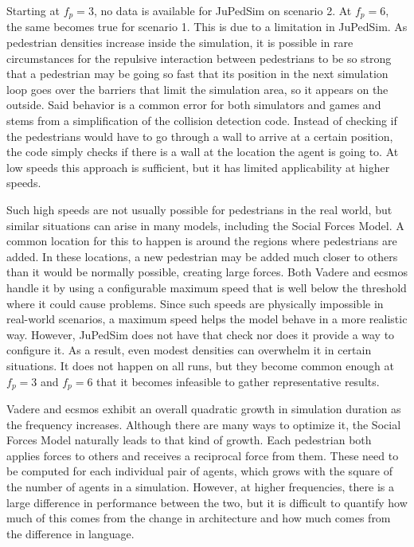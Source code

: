 \documentclass[twoside, 11pt]{article}
\begin{document}
Starting at $f_p = 3$, no data is available for JuPedSim on scenario 2. At $f_p = 6$, the same becomes true for scenario 1. This is due to a limitation in JuPedSim. As pedestrian densities increase inside the simulation, it is possible in rare circumstances for the repulsive interaction between pedestrians to be so strong that a pedestrian may be going so fast that its position in the next simulation loop goes over the barriers that limit the simulation area, so it appears on the outside. Said behavior is a common error for both simulators and games and stems from a simplification of the collision detection code. Instead of checking if the pedestrians would have to go through a wall to arrive at a certain position, the code simply checks if there is a wall at the location the agent is going to. At low speeds this approach is sufficient, but it has limited applicability at higher speeds.

Such high speeds are not usually possible for pedestrians in the real world, but similar situations can arise in many models, including the Social Forces Model. A common location for this to happen is around the regions where pedestrians are added. In these locations, a new pedestrian may be added much closer to others than it would be normally possible, creating large forces. Both Vadere and \gls{ecsmos} handle it by using a configurable maximum speed that is well below the threshold where it could cause problems. Since such speeds are physically impossible in real-world scenarios, a maximum speed helps the model behave in a more realistic way. However, JuPedSim does not have that check nor does it provide a way to configure it. As a result, even modest densities can overwhelm it in certain situations. It does not happen on all runs, but they become common enough at $f_p = 3$ and $f_p = 6$ that it becomes infeasible to gather representative results.

Vadere and \gls{ecsmos} exhibit an overall quadratic growth in simulation duration as the frequency increases. Although there are many ways to optimize it, the Social Forces Model naturally leads to that kind of growth. Each pedestrian both applies forces to others and receives a reciprocal force from them. These need to be computed for each individual pair of agents, which grows with the square of the number of agents in a simulation. However, at higher frequencies, there is a large difference in performance between the two, but it is difficult to quantify how much of this comes from the change in architecture and how much comes from the difference in language. 
\end{document}
